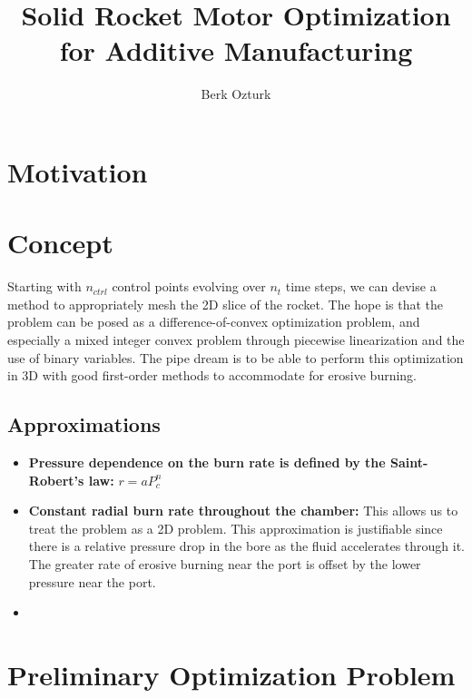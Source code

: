 \documentclass[12pt]{article}
\begin{document}
	
	
	
	\title{Solid Rocket Motor Optimization for Additive Manufacturing}
	\author{Berk Ozturk}
	
	\maketitle
	
	\section{Motivation}
	
	\section{Concept}
	
	Starting with $n_{ctrl}$ control points evolving over $n_t$ time steps, we can devise a method to appropriately mesh the 2D slice of the rocket. 
	The hope is that the problem can be posed as a difference-of-convex optimization problem, and especially a mixed integer convex problem through piecewise linearization and the use of binary variables. 
	The pipe dream is to be able to perform this optimization in 3D with good first-order methods to accommodate for erosive burning. 
	\subsection{Approximations}
	\begin{itemize}
		\item \textbf{Pressure dependence on the burn rate is defined by the Saint-Robert's law:} $r = a P_c^n$
		\item \textbf{Constant radial burn rate throughout the chamber:} This allows us to treat the problem as a 2D problem. This approximation is justifiable since there is a relative pressure drop in the bore as the fluid accelerates through it. The greater rate of erosive burning near the port is offset by the lower pressure near the port. 
		\item 
	\end{itemize}
	
	
	\section{Preliminary Optimization Problem}
	
\end{document}
